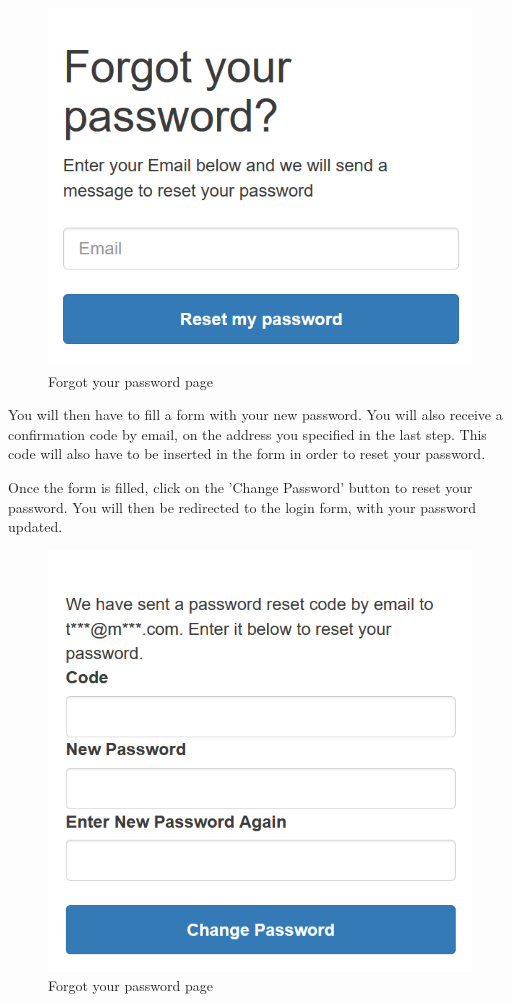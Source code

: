 \begin{figure}[H]
\centering
\includegraphics[scale=0.6]{res/Immagini/ResetPassword}
\caption{Forgot your password page}
\end{figure}

You will then have to fill a form with your new password. You will also receive a confirmation code by email, on the address you specified in the last step. This code will also have to be inserted in the form in order to reset your password.

Once the form is filled, click on the 'Change Password' button to reset your password. You will then be redirected to the login form, with your password updated.

\begin{figure}[H]
\centering
\includegraphics[scale=0.6]{res/Immagini/ResetPasswordForm}
\caption{Forgot your password page}
\end{figure}

